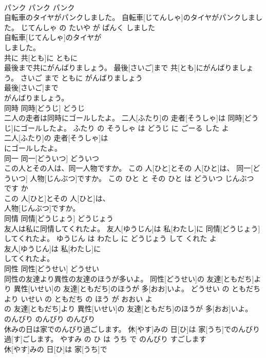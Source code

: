 \documentclass[8pt]{extreport}
\begin{document}
\begin{CJK}{UTF8}{min}
\\	パンク	パンク	パンク	
\\	自転車のタイヤがパンクしました。	自転車[じてんしゃ]のタイヤがパンクしました。	じてんしゃ の たいや が ぱんく しました	
\\	自転車[じてんしゃ]のタイヤが
\\	しました。			
\\	共に	共[とも]に	ともに	
\\	最後まで共にがんばりましょう。	最後[さいご]まで 共[とも]にがんばりましょう。	さいご まで ともに がんばりましょう	
\\	最後[さいご]まで
\\	がんばりましょう。			
\\	同時	同時[どうじ]	どうじ	
\\	二人の走者は同時にゴールしたよ。	二人[ふたり]の 走者[そうしゃ]は 同時[どうじ]にゴールしたよ。	ふたり の そうしゃ は どうじ に ごーる した よ	
\\	二人[ふたり]の 走者[そうしゃ]は
\\	にゴールしたよ。			
\\	同一	同一[どういつ]	どういつ	
\\	この人とその人は、同一人物ですか。	この 人[ひと]とその 人[ひと]は、 同一[どういつ] 人物[じんぶつ]ですか。	この ひと と その ひと は どういつ じんぶつ です か	
\\	この 人[ひと]とその 人[ひと]は、
\\	人物[じんぶつ]ですか。			
\\	同情	同情[どうじょう]	どうじょう	
\\	友人は私に同情してくれたよ。	友人[ゆうじん]は 私[わたし]に 同情[どうじょう]してくれたよ。	ゆうじん は わたし に どうじょう して くれた よ	
\\	友人[ゆうじん]は 私[わたし]に
\\	してくれたよ。			
\\	同性	同性[どうせい]	どうせい	
\\	同性の友達より異性の友達のほうが多いよ。	同性[どうせい]の 友達[ともだち]より 異性[いせい]の 友達[ともだち]のほうが 多[おお]いよ。	どうせい の ともだち より いせい の ともだち の ほう が おおい よ	
\\	の 友達[ともだち]より 異性[いせい]の 友達[ともだち]のほうが 多[おお]いよ。			
\\	のんびり	のんびり	のんびり	
\\	休みの日は家でのんびり過ごします。	休[やす]みの 日[ひ]は 家[うち]でのんびり 過[す]ごします。	やすみ の ひ は うち で のんびり すごします	
\\	休[やす]みの 日[ひ]は 家[うち]で

\end{CJK}
\end{document}
